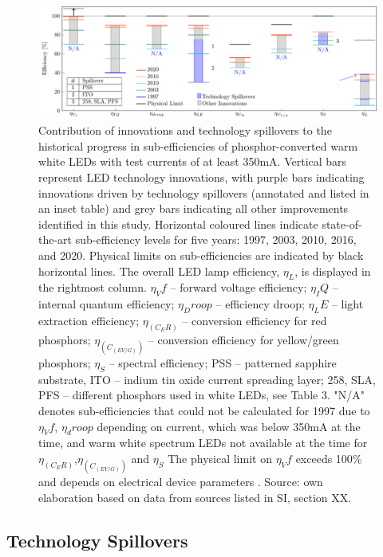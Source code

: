 \documentclass[twoside,twocolumn,9pt]{article}
\begin{document}
\begin{figure}[h]
 \centering
 \includegraphics[width=\textwidth]{2_SSL_EES/article/figures/breakthroughs_efficiency.pdf}
 \caption{Contribution of innovations and technology spillovers to the historical progress in sub-efficiencies of phosphor-converted warm white LEDs with test currents of at least 350mA. Vertical bars represent LED technology innovations, with purple bars indicating innovations driven by technology spillovers (annotated and listed in an inset table) and grey bars indicating all other improvements identified in this study. Horizontal coloured lines indicate state-of-the-art sub-efficiency levels for five years: 1997, 2003, 2010, 2016, and 2020. Physical limits on sub-efficiencies are indicated by black horizontal lines. The overall LED lamp efficiency, $\eta_L$, is displayed in the rightmost column. $\eta_Vf$ – forward voltage efficiency; $\eta_IQ$ – internal quantum efficiency; $\eta_Droop$ – efficiency droop; $\eta_LE$ – light extraction efficiency; $\eta_(C_ER)$ – conversion efficiency for red phosphors; $\eta_(C_(EY/G))$ – conversion efficiency for yellow/green phosphors; $\eta_S$ – spectral efficiency; PSS – patterned sapphire substrate, ITO – indium tin oxide current spreading layer; 258, SLA, PFS – different phosphors used in white LEDs, see Table 3. "N/A" denotes sub-efficiencies that could not be calculated for 1997 due to $\eta_Vf$, $\eta_droop$ depending on current, which was below 350mA at the time, and warm white spectrum LEDs not available at the time for $\eta_(C_ER)$,$\eta_(C_(EY/G))$  and $\eta_S$ The physical limit on $\eta_Vf$ exceeds 100\% and depends on electrical device parameters \cite{david2016electrical}. Source: own elaboration based on data from sources listed in SI, section XX.}
 \label{fgr:consumer_experience}
\end{figure}

\subsection{Technology Spillovers}
\end{document}
